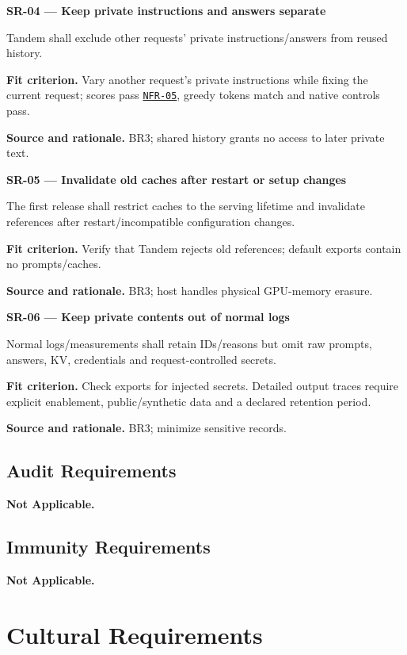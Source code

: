 \documentclass[12pt]{article}
\begin{document}
\par\medskip\noindent{}\label{req:SR-04}
\textbf{SR-04 --- Keep private instructions and answers separate}\par
Tandem shall exclude other requests' private instructions/answers from reused history.\par
\textbf{Fit criterion.} Vary another request's private instructions while fixing the current request; scores pass \hyperref[req:NFR-05]{\texttt{NFR-05}}, greedy tokens match and native controls pass.\par
\textbf{Source and rationale.} BR3; shared history grants no access to later private text.

\par\medskip\noindent{}\label{req:SR-05}
\textbf{SR-05 --- Invalidate old caches after restart or setup changes}\par
The first release shall restrict caches to the serving lifetime and invalidate references after restart/incompatible configuration changes.\par
\textbf{Fit criterion.} Verify that Tandem rejects old references; default exports contain no prompts/caches.\par
\textbf{Source and rationale.} BR3; host handles physical GPU-memory erasure.

\par\medskip\noindent{}\label{req:SR-06}
\textbf{SR-06 --- Keep private contents out of normal logs}\par
Normal logs/measurements shall retain IDs/reasons but omit raw prompts, answers, KV, credentials and request-controlled secrets.\par
\textbf{Fit criterion.} Check exports for injected secrets. Detailed output traces require explicit enablement, public/synthetic data and a declared retention period.\par
\textbf{Source and rationale.} BR3; minimize sensitive records.

\subsection{Audit Requirements}
\textbf{Not Applicable.}

\subsection{Immunity Requirements}
\textbf{Not Applicable.}

\section{Cultural Requirements}
\end{document}
